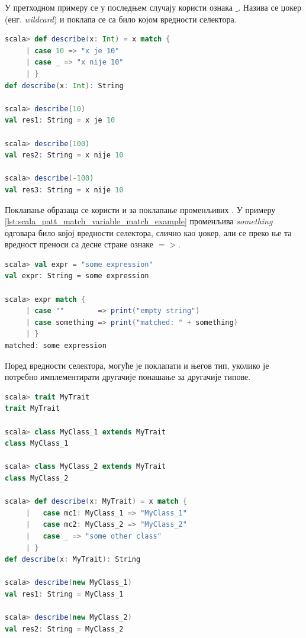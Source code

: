 \documentclass[12pt,oneside]{memoir}
\begin{document}
У претходном примеру се у последњем случају користи ознака $\_$. Назива се џокер (енг. \textit{wildcard}) и поклапа се са било којом вредности селектора.

\begin{lstlisting}[language=Scala, caption={Џокер у поклапању образаца}, label={lst:scala_patt_match_wildcard}]
scala> def describe(x: Int) = x match {
     | case 10 => "x je 10"
     | case _ => "x nije 10"
     | }
def describe(x: Int): String

scala> describe(10)
val res1: String = x je 10

scala> describe(100)
val res2: String = x nije 10

scala> describe(-100)
val res3: String = x nije 10
\end{lstlisting}

Поклапање образаца се користи и за поклапање променљивих \cite{scala_prog}. У примеру \ref{lst:scala_patt_match_variable_match_example} променљива \textit{something} одговара било којој вредности селектора, слично као џокер, али се преко ње та вредност преноси са десне стране ознаке $=>$.

\begin{lstlisting}[language=Scala, caption={Поклапање променљивих}, label={lst:scala_patt_match_variable_match_example}]
scala> val expr = "some expression"
val expr: String = some expression

scala> expr match {
     | case ""        => print("empty string")
     | case something => print("matched: " + something)
     | }
matched: some expression
\end{lstlisting}

Поред вредности селектора, могуће је поклапати и његов тип, уколико је потребно имплементирати другачије понашање за другачије типове.

\begin{lstlisting}[language=Scala, caption={Поклапање типова}, label={lst:scala_patt_match_types_example}]
scala> trait MyTrait
trait MyTrait

scala> class MyClass_1 extends MyTrait
class MyClass_1

scala> class MyClass_2 extends MyTrait
class MyClass_2

scala> def describe(x: MyTrait) = x match {
     |   case mc1: MyClass_1 => "MyClass_1"
     |   case mc2: MyClass_2 => "MyClass_2"
     |   case _ => "some other class"
     | }
def describe(x: MyTrait): String

scala> describe(new MyClass_1)
val res1: String = MyClass_1

scala> describe(new MyClass_2)
val res2: String = MyClass_2
\end{lstlisting}
\end{document}
